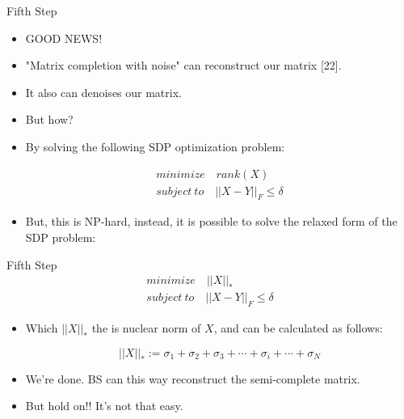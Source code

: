 \documentclass{beamer}
\begin{document}
\begin{frame}[t]{Fifth Step} %

\begin{itemize}

\item GOOD NEWS!

\item "Matrix completion with noise" can reconstruct our matrix [22].

\item It also can denoises our matrix.

\item But how?

\item By solving the following SDP optimization problem:

\begin{equation}
\begin{split}
minimize \quad rank(X) \\
subject \ to \quad ||X-Y||_F \leq \delta
\end{split}
\end{equation}

\item But, this is NP-hard, instead, it is possible to solve the relaxed form of the SDP problem:

\end{itemize}
\end{frame}

\begin{frame}[t]{Fifth Step} %
\begin{equation}
\begin{split}
minimize \quad ||X||_* \\
subject \ to \quad ||X-Y||_F \leq \delta
\end{split}
\end{equation}

\begin{itemize}
\item Which $||X||_*$ the is nuclear norm of $X$, and can be calculated as follows:

\begin{equation}
||X||_*:= \sigma_1+ \sigma_2+ \sigma_3+ \cdots+ \sigma_i+ \cdots+ \sigma_N
\end{equation}

\item We're done. BS can this way reconstruct the semi-complete matrix.

\item But hold on!! It's not that easy.

\end{itemize}
\end{frame}
\end{document}
